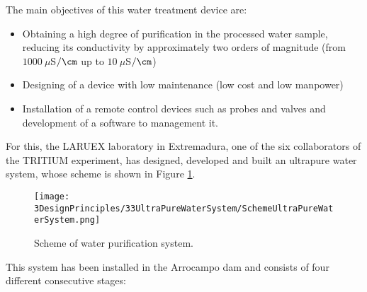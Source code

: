 The main objectives of this water treatment device are:

\begin{itemize}

\item{} Obtaining a high degree of purification in the processed water sample, reducing its conductivity by approximately two orders of magnitude (from $1000~\mu$S$/\cm$ up to $10~\mu$S$/\cm$)

\item{} Designing of a device with low maintenance (low cost  and low manpower)

\item{} Installation of a remote control devices such as probes and valves and development of a software to management it.
\end{itemize}

For this, the LARUEX laboratory in Extremadura, one of the six collaborators of the TRITIUM experiment, has designed, developed and built an ultrapure water system, whose scheme is shown in Figure \ref{fig:WPSScheme}.

\begin{figure}[htbp]
\centering
\texttt{[image: 3DesignPrinciples/33UltraPureWaterSystem/SchemeUltraPureWaterSystem.png]}
\caption{Scheme of water purification system.\label{fig:WPSScheme}}
\end{figure}

This system has been installed in the Arrocampo dam and consists of four different consecutive stages:

